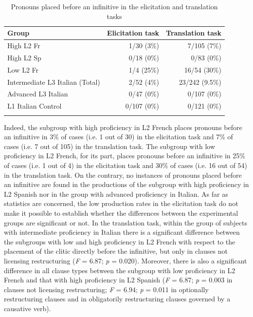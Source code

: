\documentclass[output=paper,modfonts,nonflat,newtxmath]{langsci/langscibook}
\begin{document}
\begin{table}
\caption{\label{tab:sciutti:6} Pronouns placed before an infinitive in the elicitation and translation tasks}
\begin{tabularx}{0.8\textwidth}{Xrr}
\lsptoprule
Group & Elicitation task & Translation task\\
\midrule
High L2 Fr & 1/30 (3\%) & 7/105 (7\%)\\
High L2 Sp & 0/18 (0\%) & 0/83 (0\%)\\
Low L2 Fr & 1/4 (25\%) & 16/54 (30\%)\\
Intermediate L3 Italian (Total) & 2/52 (4\%) & 23/242 (9.5\%)\\
Advanced L3 Italian & 0/47 (0\%) & 0/107 (0\%)\\
L1 Italian Control & 0/107 (0\%) & 0/121 (0\%)\\
\lspbottomrule
\end{tabularx}
\end{table}

Indeed, the subgroup with high proficiency in L2 French places pronouns before an infinitive in 3\% of cases (i.e. 1 out of 30) in the elicitation task and 7\% of cases (i.e. 7 out of 105) in the translation task. The subgroup with low proficiency in L2 French, for its part, places pronouns before an infinitive in 25\% of cases (i.e. 1 out of 4) in the elicitation task and 30\% of cases (i.e. 16 out of 54) in the translation task. On the contrary, no instances of pronouns placed before an infinitive are found in the productions of the subgroup with high proficiency in L2 Spanish nor in the group with advanced proficiency in Italian. As far as statistics are concerned, the low production rates in the elicitation task do not make it possible to establish whether the differences between the experimental groups are significant or not. In the translation task, within the group of subjects with intermediate proficiency in Italian there is a significant difference between the subgroups with low and high proficiency in L2 French with respect to the placement of the clitic directly before the infinitive, but only in clauses not licensing restructuring (\textit{F} = 6.87; \textit{p} = 0.020). Moreover, there is also a significant difference in all clause types between the subgroup with low proficiency in L2 French and that with high proficiency in L2 Spanish (\textit{F} = 6.87; \textit{p} = 0.003 in clauses not licensing restructuring; \textit{F} = 6.94; \textit{p} = 0.011 in optionally restructuring clauses and in obligatorily restructuring clauses governed by a causative verb).
\end{document}
